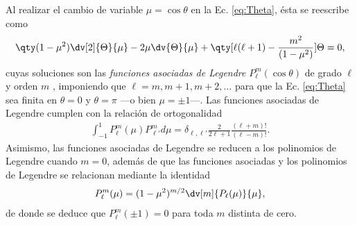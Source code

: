 Al realizar el cambio de variable $\mu = \cos\theta$ en la Ec. \eqref{eq:Theta}, ésta se reescribe como%
%
	\begin{align*}
	\qty(1-\mu^2) \dv[2]{\Theta}{\mu} - 2 \mu \dv{\Theta}{\mu} + \qty[\ell(\ell+1)-\frac{m^2}{(1-\mu^2)}]\Theta= 0,
	\end{align*}%
%
cuyas soluciones son	las \emph{funciones asociadas de Legendre} $P_\ell^m(\cos\theta)$ de grado $\ell$ y orden $m$  \cite{arfken2001methods}, imponiendo que $\ell = m, m+1,m+2,\ldots$ para  que la Ec. \eqref{eq:Theta} sea finita en $\theta = 0$ y $\theta = \pi$ ---o bien $\mu=\pm1$---. Las funciones asociadas de Legendre cumplen con la relación de ortogonalidad 
%
	\begin{align}
	\int_{-1}^1P_\ell^m(\mu) P_{\ell'}^md\mu = \delta_{\ell,\ell'}\frac{2}{2\ell+1}\frac{(\ell+m)!}{(\ell-m)!}.
	\label{eq:ortLegendre}
	\end{align}%
%
Asimismo, las funciones asociadas de Legendre se reducen a los polinomios de Legendre cuando $m=0$, además de que las funciones asociadas y los polinomios de Legendre se relacionan mediante la identidad  \cite{arfken2001methods}
	\begin{align}
	P_\ell^m (\mu) = (1-\mu^2)^{m/2}\dv[m]{P_\ell(\mu)}{\mu},
	\label{eq:Legendre}
	\end{align}
de donde se deduce  que $P_\ell^m(\pm 1)=0$ para toda $m$ distinta de cero.


